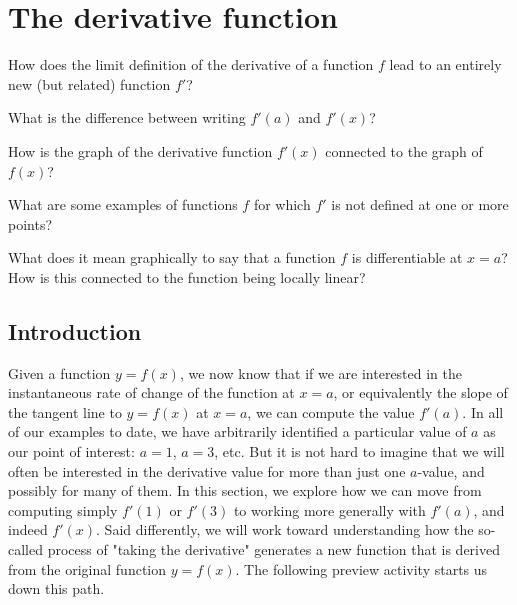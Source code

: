 \section{The derivative function} \label{S:2.2.DerivativeFxn}

\begin{goals}
\item How does the limit definition of the derivative of a function $f$ lead to an entirely new (but related) function $f'$?
\item What is the difference between writing $f'(a)$ and $f'(x)$?
\item How is the graph of the derivative function $f'(x)$ connected to the graph of $f(x)$?
\item What are some examples of functions $f$ for which $f'$ is not defined at one or more points?
\item What does it mean graphically to say that a function $f$ is differentiable at $x = a$?  How is this connected to the function being locally linear? 
\end{goals}

\subsection*{Introduction}

Given a function $y = f(x)$, we now know that if we are interested in the instantaneous rate of change of the function at $x = a$, or equivalently the slope of the tangent line to $y = f(x)$ at $x = a$, we can compute the value $f'(a)$.  In all of our examples to date, we have arbitrarily identified a particular value of $a$ as our point of interest: $a = 1$, $a = 3$, etc.  But it is not hard to imagine that we will often be interested in the derivative value for more than just one $a$-value, and possibly for many of them.  In this section, we explore how we can move from computing simply $f'(1)$ or $f'(3)$ to working more generally with $f'(a)$, and indeed $f'(x)$.  Said differently, we will work toward understanding how the so-called process of "taking the derivative" generates a new function that is derived from the original function $y = f(x)$.  The following preview activity starts us down this path.


